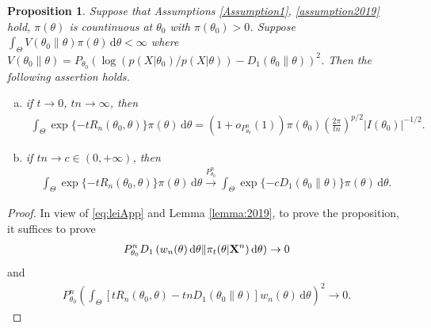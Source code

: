 \documentclass[11pt]{article}
\theoremstyle{plain}
\newtheorem{proposition}{\quad\quad Proposition}
\theoremstyle{definition}
\theoremstyle{remark}
\begin{document}
\begin{appendices}
\begin{proposition}
    Suppose that Assumptions \ref{Assumption1}, \ref{assumption2019} hold, $\pi(\theta)$ is countinuous at $\theta_0$ with $\pi(\theta_0) > 0 $.
    Suppose
    $\int_{\Theta} V(\theta_0 \| \theta) \pi(\theta) \, \mathrm d \theta  < \infty$
where $V(\theta_0 \| \theta) = P_{\theta_0} \left( \log \left( p(X|\theta_0) / p(X | \theta) \right) - D_1 (\theta_0 \| \theta) \right)^2$.
Then the following assertion holds.
\begin{enumerate}[(a)]
        \item 
            if $t \to 0$, $tn \to \infty$, then
\begin{align*}
     \int_{\Theta} \exp \{-t R_n (\theta_0, \theta)\} \pi (\theta) \, \mathrm d \theta  
     = (1+o_{P_{\theta_0}^n}(1))\pi(\theta_0) \left( \frac{2\pi}{tn} \right)^{p/2} |I(\theta_0)|^{-1/2}.
\end{align*}
        \item
            if $tn \to c \in (0,+\infty)$, then
\begin{align*}
     \int_{\Theta} \exp \{-t R_n (\theta_0, \theta)\} \pi (\theta) \, \mathrm d \theta  
     \xrightarrow{P_{\theta_0}^n}
    \int_\Theta \exp \{-c D_1 \left( \theta_0 \| \theta \right)\} \pi(\theta) \, \mathrm d \theta.
\end{align*}
    \end{enumerate}
    \label{prop:tto0}
\end{proposition}
\begin{proof}
    In view of \eqref{eq:leiApp} and Lemma \ref{lemma:2019}, to prove the proposition, it suffices to prove
\begin{align}
    P_{\theta_0}^n D_1 \left( w_n (\theta)\, \mathrm d \theta \| \pi_t (\theta| \mathbf{X}^n) \, \mathrm d \theta \right) \to 0
    \label{toProof:1}
\end{align}
and
\begin{align}
    P_{\theta_0}^n \left( 
    \int_{\Theta}
    \left[   t R_n(\theta_0, \theta) - tn D_1 (\theta_0 \| \theta )  \right]
    w_n (\theta) \, \mathrm d \theta
    \right)^2
    \to 0
    .
    \label{toProof:2}
\end{align}


\end{proof}
\end{appendices}
\end{document}
